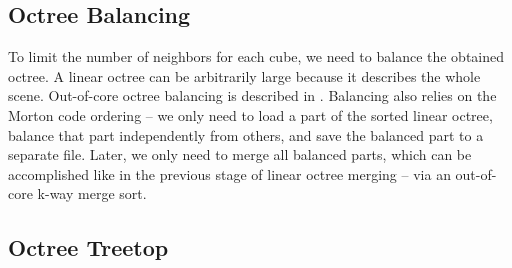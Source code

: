 \documentclass[10pt,twocolumn,letterpaper]{article}
\begin{document}
\subsection{Octree Balancing}
\label{sec:balanced-octree}

To limit the number of neighbors for each cube, we need to balance the obtained octree. A linear octree can be arbitrarily large because
it describes the whole scene. Out-of-core octree balancing is described in \cite{tu2004balance}.
Balancing also relies on the Morton code ordering -- we only need to load a part of the sorted linear octree, balance that part independently from others,
and save the balanced part to a separate file.
Later, we only need to merge all balanced parts, which can be accomplished like in the previous stage of linear octree merging -- via an out-of-core k-way merge sort.

\subsection{Octree Treetop}
\label{sec:treetop}
\end{document}
